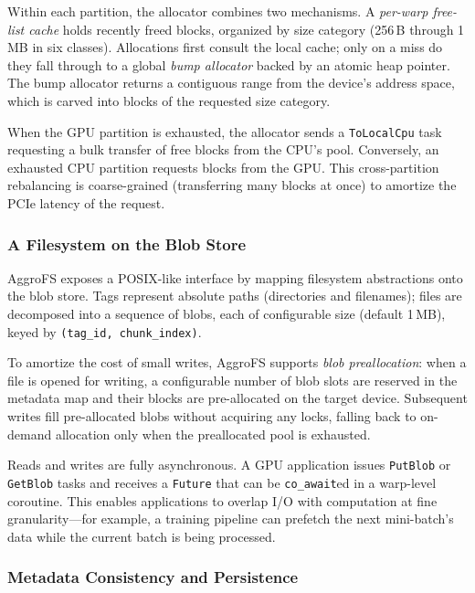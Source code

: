 Within each partition, the allocator combines two mechanisms.
A \emph{per-warp free-list cache} holds recently freed blocks,
organized by size category (256\,B through 1\,MB in six classes).
Allocations first consult the local cache; only on a miss do they
fall through to a global \emph{bump allocator} backed by an atomic
heap pointer.  The bump allocator returns a contiguous range from
the device's address space, which is carved into blocks of the
requested size category.

When the GPU partition is exhausted, the allocator sends a
\texttt{ToLocalCpu} task requesting a bulk transfer of free blocks
from the CPU's pool.  Conversely, an exhausted CPU partition
requests blocks from the GPU\@.  This cross-partition rebalancing
is coarse-grained (transferring many blocks at once) to amortize
the PCIe latency of the request.

\subsubsection{A Filesystem on the Blob Store}
\label{sec:fs-layer}

AggroFS exposes a POSIX-like interface by mapping filesystem
abstractions onto the blob store.  Tags represent absolute
paths (directories and filenames); files are decomposed into
a sequence of blobs, each of configurable size (default 1\,MB),
keyed by \texttt{(tag\_id, chunk\_index)}.

To amortize the cost of small writes, AggroFS supports
\emph{blob preallocation}: when a file is opened for writing,
a configurable number of blob slots are reserved in the metadata
map and their blocks are pre-allocated on the target device.
Subsequent writes fill pre-allocated blobs without acquiring any
locks, falling back to on-demand allocation only when the
preallocated pool is exhausted.

Reads and writes are fully asynchronous.  A GPU application
issues \texttt{PutBlob} or \texttt{GetBlob} tasks and
receives a \texttt{Future} that can be \texttt{co\_await}ed
in a warp-level coroutine.  This enables applications to
overlap I/O with computation at fine granularity---for example,
a training pipeline can prefetch the next mini-batch's data
while the current batch is being processed.

\subsubsection{Metadata Consistency and Persistence}
\label{sec:consistency}


